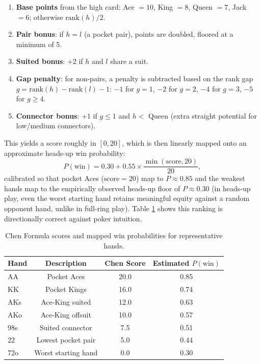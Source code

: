 \documentclass[11pt]{article}
\begin{document}
\begin{enumerate}
    \item \textbf{Base points} from the high card: Ace $=10$, King $=8$, Queen
    $=7$, Jack $=6$; otherwise $\text{rank}(h)/2$.
    \item \textbf{Pair bonus}: if $h = l$ (a pocket pair), points are doubled,
    floored at a minimum of 5.
    \item \textbf{Suited bonus}: $+2$ if $h$ and $l$ share a suit.
    \item \textbf{Gap penalty}: for non-pairs, a penalty is subtracted based on
    the rank gap $g = \text{rank}(h) - \text{rank}(l) - 1$: $-1$ for $g=1$,
    $-2$ for $g=2$, $-4$ for $g=3$, $-5$ for $g \geq 4$.
    \item \textbf{Connector bonus}: $+1$ if $g \leq 1$ and $h < $ Queen (extra
    straight potential for low/medium connectors).
\end{enumerate}

This yields a score roughly in $[0, 20]$, which is then linearly mapped onto
an approximate heads-up win probability:
\[
    P(\text{win}) = 0.30 + 0.55 \times \frac{\min(\text{score}, 20)}{20},
\]
calibrated so that pocket Aces ($\text{score}=20$) map to $P \approx 0.85$
and the weakest hands map to the empirically observed heads-up floor of
$P \approx 0.30$ (in heads-up play, even the worst starting hand retains
meaningful equity against a random opponent hand, unlike in full-ring play).
Table \ref{tab:chen} shows this ranking is directionally correct against
poker intuition.

\begin{table}[h]
\centering
\begin{tabular}{lccc}
\toprule
Hand & Description & Chen Score & Estimated $P(\text{win})$ \\
\midrule
AA & Pocket Aces & 20.0 & 0.85 \\
KK & Pocket Kings & 16.0 & 0.74 \\
AKs & Ace-King suited & 12.0 & 0.63 \\
AKo & Ace-King offsuit & 10.0 & 0.57 \\
98s & Suited connector & 7.5 & 0.51 \\
22 & Lowest pocket pair & 5.0 & 0.44 \\
72o & Worst starting hand & 0.0 & 0.30 \\
\bottomrule
\end{tabular}
\caption{Chen Formula scores and mapped win probabilities for representative hands.}
\label{tab:chen}
\end{table}
\end{document}
